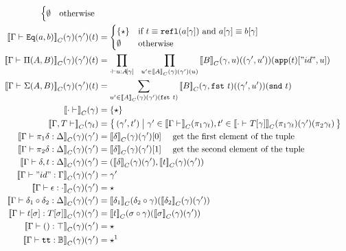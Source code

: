 \begin{align*}
\begin{cases}
      \emptyset & \text{otherwise }
    \end{cases}\\
  \denotesC{\goodType{\Gm}{\TyId{a}{b}}{}}(\gm)(\gm')(t) &= 
  \begin{cases}
    \{\star\} & \text{if } t \equiv \eqrefl{\sub{a}{\gm}} \text{ and } \sub{a}{\gm} \equiv \sub{b}{\gm}\\
    \emptyset & \text{otherwise }
  \end{cases}\\
  \denotesC{\goodType{\Gm}{\TyPi{A}{B}}{}}(\gm)(\gm')(t) &= \prod_{\goodTerm{\cdot}{u}{\sub{A}{\gm}}} \ \ \prod_{u' \in \denotesC{A}(\gm)(\gm')(u)} \denotesC{B}(\SubstExt{\gm}{u})((\gm', u'))(\sub{\app{t}}{\SubstExt{"id"}{u}})\\
  \denotesC{\goodType{\Gm}{\TySigma{A}{B}}{}}(\gm)(\gm')(t) &= \sum_{u' \in \denotesC{A}(\gm)(\gm')(\fst{t})} \denotesC{B}(\SubstExt{\gm}{\fst{t}})((\gm', u'))(\snd{t}) \\
  \denotesC{\goodCtx{\cdot}{}}(\gm) &= \{\star\}  \\ 
  \denotesC{\goodCtx{\Gm, T}{}}(\gm_t) &= \setc{ (\gamma' , t') }{ \gm' \in \denotesC{\goodCtx{\Gm}{}}(\pi_1 \gm_t), t' \in \denotesC{\goodType{\cdot}{\sub{T}{\gm}}{}}(\pi_1 \gm_t)(\gm')(\pi_2 \gm_t)  } \\
  \denotesC{\goodSub{\Gm}{\pi_1 \delta}{\Dl}}(\gm)(\gm') &= \denotesC{\delta}(\gm)(\gm')[0] \quad \text{ get the first element of the tuple} \\
  \denotesC{\goodTerm{\Gm}{\pi_2 \delta}{\Dl}}(\gm)(\gm') &= \denotesC{\delta}(\gm)(\gm')[1] \quad \text{ get the second element of the tuple} \\
  \denotesC{\goodSub{\Gm}{\SubstExt{\delta}{t}}{\Dl}}(\gm)(\gm') &= (\denotesC{\delta}(\gm)(\gm'),\denotesC{t}(\gm)(\gm')) \\ 
  \denotesC{\goodSub{\Gm}{"id"}{\Gm}}(\gm)(\gm') &= \gm' \\
  \denotesC{\goodSub{\Gm}{\SubstEmp}{\cdot}}(\gm)(\gm') &= \star \\
  \denotesC{\goodSub{\Gm}{\delta_1 \circ \delta_2}{\Dl}}(\gm)(\gm') &= \denotesC{\delta_1}(\SubstComp{\delta_2}{\gm})(\denotesC{\delta_2}(\gm)(\gm')) \\
  \denotesC{\goodTerm{\Gm}{\sub{t}{\sigma}}{\sub{T}{\sigma}}}(\gm)(\gm') &= \denotesC{t}(\sigma \circ \gm)(\denotesC{\sigma}(\gm)(\gm')) \\
  \denotesC{\goodTerm{\Gm}{\unit}{\top}}(\gm)(\gm') &= \star\\
  \denotesC{\goodTerm{\Gm}{\true}{\cB}}(\gm)(\gm') &= \star^1 \\

\end{align*}
